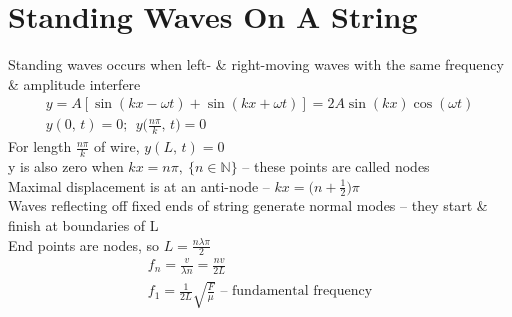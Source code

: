 \documentclass[a4paper, 11pt, fleqn, normalem]{report}
\begin{document}
\section{Standing Waves On A String}
Standing waves occurs when left- \& right-moving waves with the same frequency \& amplitude interfere
\begin{gather*}
    y = A[\sin{(kx - \omega t)} + \sin{(kx + \omega t)}] = 2A\sin{(kx)}\cos{(\omega t)} \\
    y(0,\,t) = 0;\;\,y\Big(\frac{n\pi}{k},\,t\Big) = 0
\end{gather*}
For length $\frac{n\pi}{k}$ of wire, $y(L,\,t) = 0$ \\
y is also zero when $kx = n\pi,~\{ n \in \mathbb{N}\}$ -- these points are called nodes \\
Maximal displacement is at an anti-node -- $kx = \Big(n + \frac{1}{2}\Big)\pi$ \\
Waves reflecting off fixed ends of string generate normal modes -- they start \& finish at boundaries of L \\
End points are nodes, so $L = \frac{n\lambda\pi}{2}$
\begin{gather*}
    f_{n} = \frac{v}{\lambda n} = \frac{nv}{2L} \\
    f_{1} = \frac{1}{2L}\sqrt{\frac{F}{\mu}}\text{ -- fundamental frequency}
\end{gather*}
\end{document}
